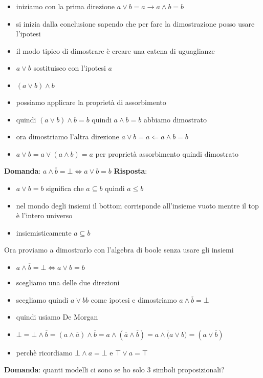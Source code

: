 \documentclass{article}
\begin{document}
\begin{itemize}
    \item iniziamo con la prima direzione $a \lor b = a \to a \land b = b$
    \item si inizia dalla conclusione sapendo che per fare la dimostrazione posso usare l'ipotesi
    \item il modo tipico di dimostrare è creare una catena di uguaglianze
    \item $a \lor b$ sostituisco con l'ipotesi $a$
    \item $(a \lor b) \land b$
    \item possiamo applicare la proprietà di assorbimento
    \item quindi $(a \lor b) \land b = b$ quindi $a \land b = b$ abbiamo dimostrato
    \item ora dimostriamo l'altra direzione $a \lor b = a \Leftarrow a \land b = b$
    \item $a \lor b = a \lor (a \land b)=a$ per proprietà assorbimento quindi dimostrato
\end{itemize}
\textbf{Domanda}: $a \land \overline{b} = \bot \iff a \lor b = b$
\textbf{Risposta}:
\begin{itemize}
    \item $a \lor b = b$ significa che $a \subseteq b$ quindi $a \leq b$
    \item nel mondo degli insiemi il bottom corrisponde all'insieme vuoto mentre il top è l'intero universo
    \item insiemisticamente $a \subseteq b$
\end{itemize}
Ora proviamo a dimostrarlo con l'algebra di boole senza usare gli insiemi
\begin{itemize}
    \item $a \land \overline{b} = \bot \iff a \lor b = b$
    \item scegliamo una delle due direzioni
    \item scegliamo quindi $a \lor b b$ come ipotesi e dimostriamo $a \land \overline{b} = \bot$
    \item quindi usiamo De Morgan
    \item $\bot = \bot \land \overline{b} = (a \land \overline{a}) \land \overline{b} = a \land (\overline{a} \land \overline{b}) = a \land \overline(a \lor b) = (a \lor \overline{b})$
    \item perchè ricordiamo $\bot \land a = \bot$ e $\top \lor a = \top$
\end{itemize}
\textbf{Domanda}: quanti modelli ci sono se ho solo 3 simboli proposizionali? \\
\end{document}
